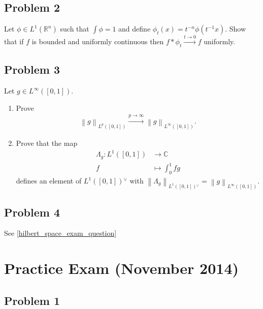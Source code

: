 \hypertarget{problem-2-1}{%
\subsection{Problem 2}\label{problem-2-1}}

Let \(\phi\in L^1({\mathbb{R}}^n)\) such that \(\int \phi = 1\) and
define \(\phi_t(x) = t^{-n}\phi(t^{-1}x)\). Show that if \(f\) is
bounded and uniformly continuous then
\(f\ast \phi_t \overset{t\to 0}\to f\) uniformly.

\hypertarget{problem-3-1}{%
\subsection{Problem 3}\label{problem-3-1}}

Let \(g\in L^\infty([0, 1])\).

\begin{enumerate}
\def\labelenumi{\alph{enumi}.}
\item
  Prove
  \begin{align*}
  {\left\lVert {g} \right\rVert}_{L^p([0, 1])}  \overset{p\to\infty}\to {\left\lVert {g} \right\rVert}_{L^\infty([0, 1])}
  .\end{align*}
\item
  Prove that the map
  \begin{align*}
  \Lambda_g: L^1([0, 1]) &\to {\mathbb{C}}\\
  f &\mapsto \int_0^1 fg
  \end{align*}
  defines an element of \(L^1([0, 1]) {}^{ \vee }\) with
  \({\left\lVert {\Lambda_g} \right\rVert}_{L^1([0, 1]) {}^{ \vee }}= {\left\lVert {g} \right\rVert}_{L^\infty([0, 1])}\).
\end{enumerate}

\hypertarget{problem-4-1}{%
\subsection{Problem 4}\label{problem-4-1}}

See \cref{hilbert_space_exam_question}

\hypertarget{practice-exam-november-2014}{%
\section{Practice Exam (November
2014)}\label{practice-exam-november-2014}}

\hypertarget{problem-1-2}{%
\subsection{Problem 1}\label{problem-1-2}}

